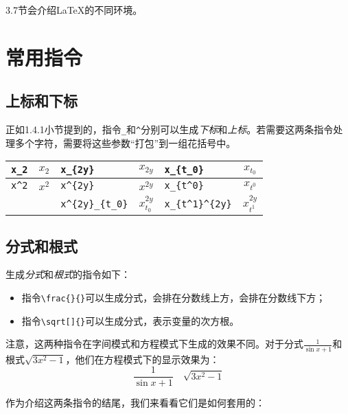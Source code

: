 3.7节会介绍\LaTeX 的不同环境。

\section{常用指令}

\subsection{上标和下标}

正如1.4.1小节提到的，指令\verb|_|和\verb|^|分别可以生成\emph{下标}和\emph{上标}。若需要这两条指令处理多个字符，需要将这些参数“打包”到一组花括号中。

\begin{center}
  \begin{tabular}{lc|lc|lc}
    \verb|x_2| & $x_2$ & \verb|x_{2y}| & $x_{2y}$ & \verb|x_{t_0}| & $x_{t_0}$ \\
    \hline
    \verb|x^2| & $x^2$ & \verb|x^{2y}| & $x^{2y}$ & \verb|x_{t^0}| & $x_{t^0}$ \\
    \hline
    & &  \verb|x^{2y}_{t_0}| & $x^{2y}_{t_0}$ & \verb|x_{t^1}^{2y}| & $x_{t^1}^{2y}$
  \end{tabular}
\end{center}

\subsection{分式和根式}

生成\emph{分式}和\emph{根式}的指令如下：

\begin{itemize}
  \item 指令\verb|\frac{|\verb|}{|\verb|}|可以生成分式，会排在分数线上方，会排在分数线下方；
  \item 指令\verb|\sqrt[|\verb|]{|\verb|}|可以生成分式，表示变量的次方根。
\end{itemize}

注意，这两种指令在字间模式和方程模式下生成的效果不同。对于分式$\frac{1}{\sin x + 1}$和根式$\sqrt{3x^2-1}$，他们在方程模式下的显示效果为：
\begin{displaymath}
  \frac{1}{\sin x + 1}\quad \sqrt{3x^2-1}
\end{displaymath}

作为介绍这两条指令的结尾，我们来看看它们是如何套用的：

